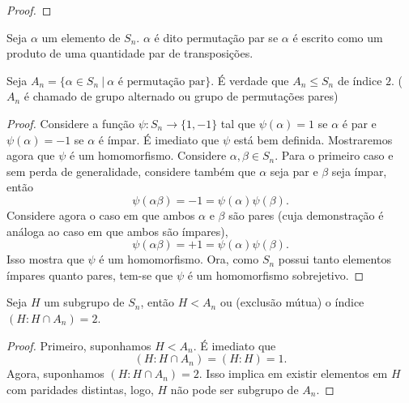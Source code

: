 \documentclass[11pt,openany]{book}
\newenvironment{novo}{
    \color{red}
}{}
\begin{document}
\begin{novo}
\begin{proof}
\end{proof}

\begin{definition}
\label{def:permutacao_par}
    Seja $\alpha$ um elemento de $S_n$. $\alpha$ é dito permutação par se $\alpha$ é escrito como um produto de uma quantidade par de transposições.
\end{definition}
\begin{proposition}
\label{prop:}
    Seja $A_n = \{\alpha \in S_n \ | \ \text{$\alpha$ é permutação par}\}.$ É verdade que $A_n \leq S_n$ de índice $2$. ($A_n$ é chamado de grupo alternado ou grupo de permutações pares)
\end{proposition}

\begin{proof}
    Considere a função $\psi: S_n \rightarrow \{1, -1\}$ tal que $\psi(\alpha) = 1$ se $\alpha$ é par e $\psi(\alpha) = -1$ se $\alpha$ é ímpar. É imediato que $\psi$ está bem definida. Mostraremos agora que $\psi$ é um homomorfismo. Considere $\alpha, \beta \in S_n$. Para o primeiro caso e sem perda de generalidade, considere também que $\alpha$ seja par e $\beta$ seja ímpar, então
    \[\psi(\alpha \beta) =  -1 = \psi(\alpha) \psi(\beta).\]
    Considere agora o caso em que ambos $\alpha$ e $\beta$ são pares (cuja demonstração é análoga ao caso em que ambos são ímpares),
    \[\psi(\alpha \beta) = +1 = \psi(\alpha) \psi(\beta).\]
    Isso mostra que $\psi$ é um homomorfismo.
    Ora, como $S_n$ possui tanto elementos ímpares quanto pares, tem-se que $\psi$ é um homomorfismo sobrejetivo.
\end{proof}
\end{novo}

\begin{novo}
\begin{proposition}
    Seja $H$ um subgrupo de $S_n$, então $H < A_n$ ou (exclusão mútua) o índice $(H:H \cap A_n) = 2$.
\end{proposition}
\begin{proof}
    Primeiro, suponhamos $H < A_n$. É imediato que
    \[(H:H \cap A_n) = (H:H) = 1.\]
    Agora, suponhamos $(H:H \cap A_n) = 2$. Isso implica em existir elementos em $H$ com paridades distintas, logo, $H$ não pode ser subgrupo de $A_n$.
\end{proof}
\end{novo}
\end{document}
